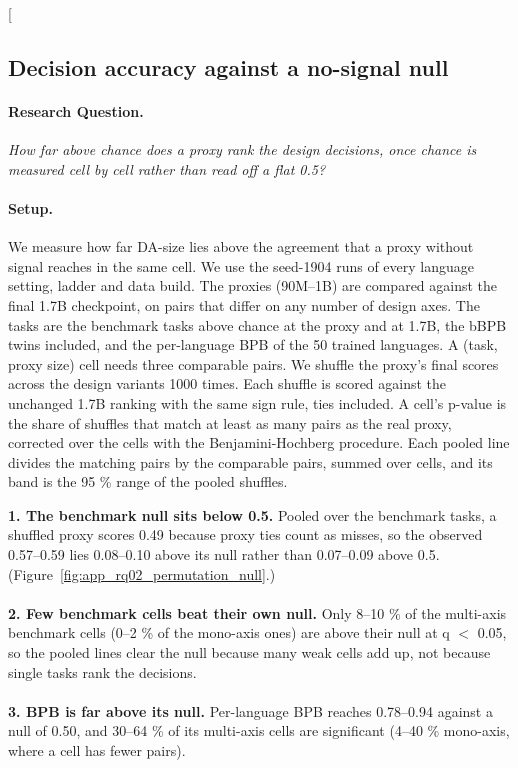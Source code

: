 \clearpage
\twocolumn[{%
\rqparent
\subsection{Decision accuracy against a no-signal null}
\label{app:rq02_permutation_null}

\noindent\begin{minipage}[t]{0.485\textwidth}
\vspace{0pt}
\paragraph{Research Question.} \emph{How far above chance does a proxy rank the design decisions, once chance is measured cell by cell rather than read off a flat 0.5?}

\paragraph{Setup.} We measure how far DA-size lies above the agreement that a proxy without signal reaches in the same cell. We use the seed-1904 runs of every language setting, ladder and data build. The proxies (90M--1B) are compared against the final 1.7B checkpoint, on pairs that differ on any number of design axes. The tasks are the benchmark tasks above chance at the proxy and at 1.7B, the bBPB twins included, and the per-language BPB of the 50 trained languages. A (task, proxy size) cell needs three comparable pairs. We shuffle the proxy's final scores across the design variants 1000 times. Each shuffle is scored against the unchanged 1.7B ranking with the same sign rule, ties included. A cell's p-value is the share of shuffles that match at least as many pairs as the real proxy, corrected over the cells with the Benjamini-Hochberg procedure. Each pooled line divides the matching pairs by the comparable pairs, summed over cells, and its band is the 95 \% range of the pooled shuffles.
\end{minipage}\hfill
\begin{minipage}[t]{0.485\textwidth}
\vspace{0pt}
\begin{rqfinding}
\textbf{1. The benchmark null sits below 0.5.} Pooled over the benchmark tasks, a shuffled proxy scores 0.49 because proxy ties count as misses, so the observed 0.57--0.59 lies 0.08--0.10 above its null rather than 0.07--0.09 above 0.5. (Figure~\ref{fig:app_rq02_permutation_null}.)
\\
\\
\textbf{2. Few benchmark cells beat their own null.} Only 8--10 \% of the multi-axis benchmark cells (0--2 \% of the mono-axis ones) are above their null at q $<$ 0.05, so the pooled lines clear the null because many weak cells add up, not because single tasks rank the decisions.
\\
\\
\textbf{3. BPB is far above its null.} Per-language BPB reaches 0.78--0.94 against a null of 0.50, and 30--64 \% of its multi-axis cells are significant (4--40 \% mono-axis, where a cell has fewer pairs).
\end{rqfinding}
\end{minipage}

}
